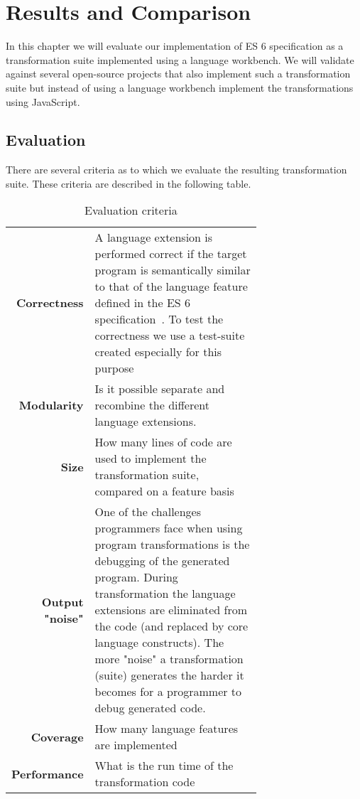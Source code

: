 
\chapter{Results and Comparison} %

\label{Chapter4}


In this chapter we will evaluate our implementation of ES 6 specification as a transformation suite implemented using a language workbench. We will validate against several open-source projects that also implement such a transformation suite but instead of using a language workbench implement the transformations using JavaScript.

\section{Evaluation}

There are several criteria as to which we evaluate the resulting transformation suite. These criteria are described in the following table.

\begin{table}[h]
\def\arraystretch{1.5}
\caption{Evaluation criteria}
\label{criteria}
\begin{tabular}{rp{0.7\linewidth}}
{\bf Correctness} & A language extension is performed correct if the target program is semantically similar to that of the language feature defined in the ES 6 specification~\cite{SpecJS}. To test the correctness we use a test-suite created especially for this purpose\footnotemark\\
{\bf Modularity}  & Is it possible separate and recombine the different language extensions.\\
{\bf Size}        & How many lines of code are used to implement the transformation suite, compared on a feature basis\\
{\bf Output "noise"} & One of the challenges programmers face when using program transformations is the debugging of the generated program. During transformation the language extensions are eliminated from the code (and replaced by core language constructs). The more "noise" a transformation (suite) generates the harder it becomes for a programmer to debug generated code. \\
{\bf Coverage}    & How many language features are implemented\\
{\bf Performance} & What is the run time of the transformation code\\
\end{tabular}
\end{table}

